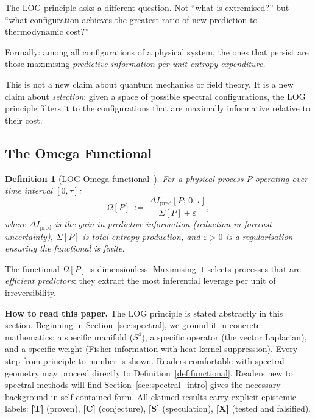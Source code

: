 \documentclass[12pt,a4paper]{article}
\newcommand{\Om}{\Omega}
\newtheorem{definition}{Definition}[section]
\begin{document}
The LOG principle asks a different question.
Not ``what is extremised?'' but ``what configuration
achieves the greatest ratio of new prediction to
thermodynamic cost?''

Formally: among all configurations of a physical system,
the ones that persist are those maximising
\emph{predictive information per unit entropy expenditure.}

This is not a new claim about quantum mechanics or
field theory. It is a new claim about \emph{selection}:
given a space of possible spectral configurations,
the LOG principle filters it to the configurations
that are maximally informative relative to their cost.

\subsection{The Omega Functional}
\label{sec:omega}

\begin{definition}[LOG Omega functional~\cite{LogOmega}]
For a physical process $P$ operating over time interval $[0,\tau]$:
\begin{equation}
  \Om[P]
  \;:=\;
  \frac{\Delta I_{\mathrm{pred}}[P;\,0,\tau]}
       {\Sigma[P] + \varepsilon},
\label{eq:omega}
\end{equation}
where $\Delta I_{\mathrm{pred}}$ is the gain in predictive
information (reduction in forecast uncertainty), $\Sigma[P]$
is total entropy production, and $\varepsilon > 0$ is a
regularisation ensuring the functional is finite.
\end{definition}

The functional $\Om[P]$ is dimensionless.
Maximising it selects processes that are \emph{efficient
predictors}: they extract the most inferential leverage
per unit of irreversibility.

\begin{readerbox}
\textbf{How to read this paper.}
The LOG principle is stated abstractly in this section.
Beginning in Section~\ref{sec:spectral}, we ground it
in concrete mathematics: a specific manifold ($S^4$),
a specific operator (the vector Laplacian),
and a specific weight (Fisher information with heat-kernel
suppression). Every step from principle to number is shown.
Readers comfortable with spectral geometry may proceed
directly to Definition~\ref{def:functional}.
Readers new to spectral methods will find
Section~\ref{sec:spectral_intro} gives the necessary
background in self-contained form.
All claimed results carry explicit epistemic labels:
\textbf{[T]} (proven), \textbf{[C]} (conjecture),
\textbf{[S]} (speculation), \textbf{[X]} (tested and falsified).
\end{readerbox}
\end{document}
